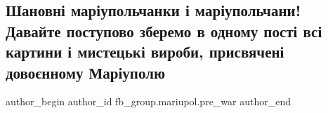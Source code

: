  
 
 
 
 

\subsection{Шановні маріупольчанки і маріупольчани! Давайте поступово зберемо в одному пості всі картини і мистецькі вироби, присвячені довоєнному Маріуполю}
\label{sec:12_02_2023.fb.fb_group.mariupol.pre_war.2.shanovn__mar_upolcha}

\ifcmt
 author_begin
   author_id fb_group.mariupol.pre_war
 author_end
\fi
